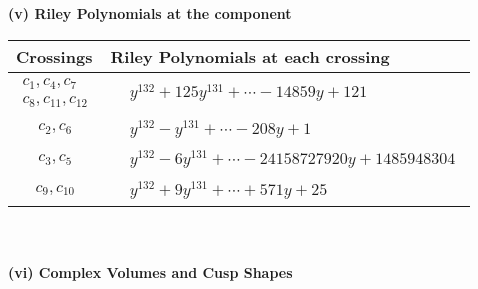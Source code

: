 \documentclass[1p]{elsarticle_modified}
\theoremstyle{definition}
\begin{document}
\newpage\renewcommand{\arraystretch}{1}
\flushleft \textbf{(v) Riley Polynomials at the component}\newline \\
\begin{tabular}{m{50pt}|m{274pt}}
Crossings & \hspace{64pt}Riley Polynomials at each crossing \\
\hline $$\begin{aligned}c_{1},c_{4},c_{7}\\c_{8},c_{11},c_{12}\end{aligned}$$&$\begin{aligned}
&y^{132}+125 y^{131}+\cdots-14859 y+121
\end{aligned}$\\
\hline $$\begin{aligned}c_{2},c_{6}\end{aligned}$$&$\begin{aligned}
&y^{132}- y^{131}+\cdots-208 y+1
\end{aligned}$\\
\hline $$\begin{aligned}c_{3},c_{5}\end{aligned}$$&$\begin{aligned}
&y^{132}-6 y^{131}+\cdots-24158727920 y+1485948304
\end{aligned}$\\
\hline $$\begin{aligned}c_{9},c_{10}\end{aligned}$$&$\begin{aligned}
&y^{132}+9 y^{131}+\cdots+571 y+25
\end{aligned}$\\
\hline
\end{tabular}\\~\\
\newpage\flushleft \textbf{(vi) Complex Volumes and Cusp Shapes}
\end{document}
